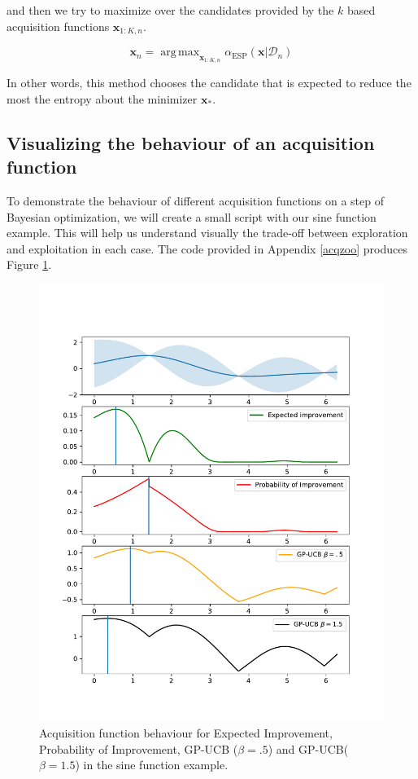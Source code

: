 \documentclass[10pt,a4paper,twoside]{book}
\DeclareMathOperator*{\argmax}{arg\,max}
\begin{document}
and then we try to maximize over the candidates provided by the $k$ based acquisition functions $\boldsymbol{x}_{1:K, n}$.

\begin{equation}
\boldsymbol{x}_n = \argmax_{\boldsymbol{x}_{1:K, n}} \alpha_{\mathrm{ESP}}(\boldsymbol{x}|\mathcal{D}_n)
\end{equation}

In other words, this method chooses the candidate that is expected to reduce the most the entropy about the minimizer $\boldsymbol{x}_*$. 

\subsection{Visualizing the behaviour of an acquisition function}

To demonstrate the behaviour of different acquisition functions on a step of Bayesian optimization, we will create a small script with our sine function example. This will help us understand visually the trade-off between exploration and exploitation in each case. The code provided in Appendix \ref{acqzoo} produces Figure \ref{fig:acqzoo}.


\begin{figure}
\centering
\caption{Acquisition function behaviour for Expected Improvement, Probability of Improvement, GP-UCB ($\beta = .5$) and GP-UCB($\beta = 1.5$) in the sine function example.}
\label{fig:acqzoo}
\includegraphics[scale=.6]{figures/chapter3/acqzoo}
\end{figure}
\end{document}
